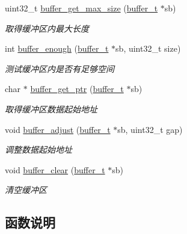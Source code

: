 \begin{DoxyCompactItemize}
uint32\+\_\+t \hyperlink{a00038_a13dfff4814bad92a4f5c263b68ddf475_a13dfff4814bad92a4f5c263b68ddf475}{buffer\+\_\+get\+\_\+max\+\_\+size} (\hyperlink{a00044_aad99a77d28bd81d3d36d0ea569c9482d_aad99a77d28bd81d3d36d0ea569c9482d}{buffer\+\_\+t} $\ast$sb)
\begin{DoxyCompactList}\small\item\em 取得缓冲区内最大长度 \end{DoxyCompactList}\item 
int \hyperlink{a00038_ae5cb663b693f41f93952c34cdd7f1f14_ae5cb663b693f41f93952c34cdd7f1f14}{buffer\+\_\+enough} (\hyperlink{a00044_aad99a77d28bd81d3d36d0ea569c9482d_aad99a77d28bd81d3d36d0ea569c9482d}{buffer\+\_\+t} $\ast$sb, uint32\+\_\+t size)
\begin{DoxyCompactList}\small\item\em 测试缓冲区内是否有足够空间 \end{DoxyCompactList}\item 
char $\ast$ \hyperlink{a00038_ab54cc02c921fa0034efe6fbd146de96c_ab54cc02c921fa0034efe6fbd146de96c}{buffer\+\_\+get\+\_\+ptr} (\hyperlink{a00044_aad99a77d28bd81d3d36d0ea569c9482d_aad99a77d28bd81d3d36d0ea569c9482d}{buffer\+\_\+t} $\ast$sb)
\begin{DoxyCompactList}\small\item\em 取得缓冲区数据起始地址 \end{DoxyCompactList}\item 
void \hyperlink{a00038_a1e574a50d7d434434bc466978601b703_a1e574a50d7d434434bc466978601b703}{buffer\+\_\+adjust} (\hyperlink{a00044_aad99a77d28bd81d3d36d0ea569c9482d_aad99a77d28bd81d3d36d0ea569c9482d}{buffer\+\_\+t} $\ast$sb, uint32\+\_\+t gap)
\begin{DoxyCompactList}\small\item\em 调整数据起始地址 \end{DoxyCompactList}\item 
void \hyperlink{a00038_a0f64078ea08b7269039ea6694f009729_a0f64078ea08b7269039ea6694f009729}{buffer\+\_\+clear} (\hyperlink{a00044_aad99a77d28bd81d3d36d0ea569c9482d_aad99a77d28bd81d3d36d0ea569c9482d}{buffer\+\_\+t} $\ast$sb)
\begin{DoxyCompactList}\small\item\em 清空缓冲区 \end{DoxyCompactList}\end{DoxyCompactItemize}


\subsection{函数说明}
\hypertarget{a00038_a1e574a50d7d434434bc466978601b703_a1e574a50d7d434434bc466978601b703}{}
